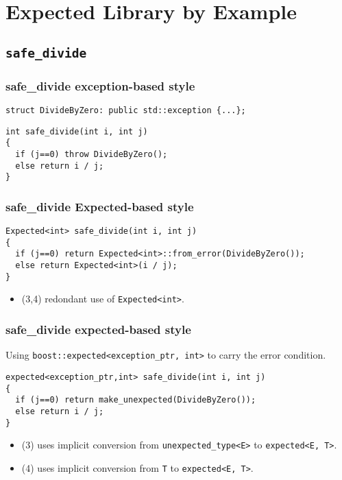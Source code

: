 \documentclass[xcolor=dvipsnames]{beamer}
\newcommand{\cpp}[1]{\lstinline{#1}}
\begin{document}
\section{Expected Library by Example}
\subsection{\cpp{safe_divide}}
\begin{frame}[fragile]
\frametitle{safe\_divide exception-based style}

\begin{lstlisting}
struct DivideByZero: public std::exception {...};
\end{lstlisting}

\begin{lstlisting}
int safe_divide(int i, int j)
{
  if (j==0) throw DivideByZero();
  else return i / j;
}
\end{lstlisting}
\end{frame}
\begin{frame}[fragile]
\frametitle{safe\_divide Expected-based style}

\begin{lstlisting}
Expected<int> safe_divide(int i, int j)
{
  if (j==0) return Expected<int>::from_error(DivideByZero());
  else return Expected<int>(i / j);
}
\end{lstlisting}
\begin{itemize}
  \item (3,4) redondant use of  \cpp{Expected<int>}. 
\end{itemize}

\end{frame}
\begin{frame}[fragile]
\frametitle{safe\_divide expected-based style}

Using \cpp{boost::expected<exception_ptr, int>} to carry the error condition.

\begin{lstlisting}
expected<exception_ptr,int> safe_divide(int i, int j)
{
  if (j==0) return make_unexpected(DivideByZero());
  else return i / j;
}
\end{lstlisting}

\begin{itemize}
  \item (3) uses implicit conversion from \cpp{unexpected_type<E>} to \cpp{expected<E, T>}. 
  \item (4) uses implicit conversion from \cpp{T} to \cpp{expected<E, T>}.
\end{itemize}

\end{frame}
\end{document}
